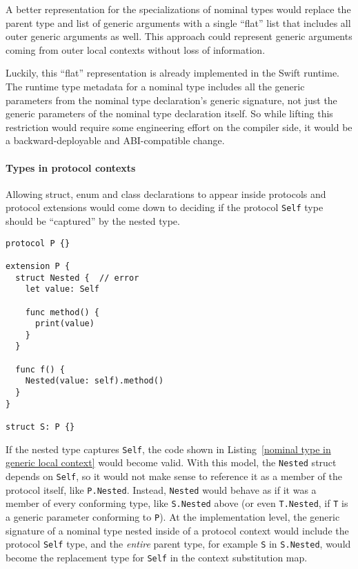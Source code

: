 \documentclass[../generics]{subfiles}
\begin{document}
A better representation for the specializations of nominal types would replace the parent type and list of generic arguments with a single ``flat'' list that includes all outer generic arguments as well. This approach could represent generic arguments coming from outer local contexts without loss of information.

Luckily, this ``flat'' representation is already implemented in the Swift runtime. The runtime type metadata for a nominal type includes all the generic parameters from the nominal type declaration's generic signature, not just the generic parameters of the nominal type declaration itself. So while lifting this restriction would require some engineering effort on the compiler side, it would be a backward-deployable and ABI-compatible change.

\paragraph{Types in protocol contexts} Allowing struct, enum and class declarations to appear inside protocols and protocol extensions would come down to deciding if the protocol \texttt{Self} type should be ``captured'' by the nested type.

\begin{listing}\label{nominal type in protocol context}
\begin{Verbatim}
protocol P {}

extension P {
  struct Nested {  // error
    let value: Self

    func method() {
      print(value)
    }
  }
  
  func f() {
    Nested(value: self).method()
  }
}

struct S: P {}
\end{Verbatim}
\end{listing}
If the nested type captures \texttt{Self}, the code shown in Listing~\ref{nominal type in generic local context} would become valid. With this model, the \texttt{Nested} struct depends on \texttt{Self}, so it would not make sense to reference it as a member of the protocol itself, like \texttt{P.Nested}. Instead, \texttt{Nested} would behave as if it was a member of every conforming type, like \texttt{S.Nested} above (or even \texttt{T.Nested}, if \texttt{T} is a generic parameter conforming to \texttt{P}). At the implementation level, the generic signature of a nominal type nested inside of a protocol context would include the protocol \texttt{Self} type, and the \emph{entire} parent type, for example \texttt{S} in \texttt{S.Nested}, would become the replacement type for \texttt{Self} in the context substitution map.
\end{document}
